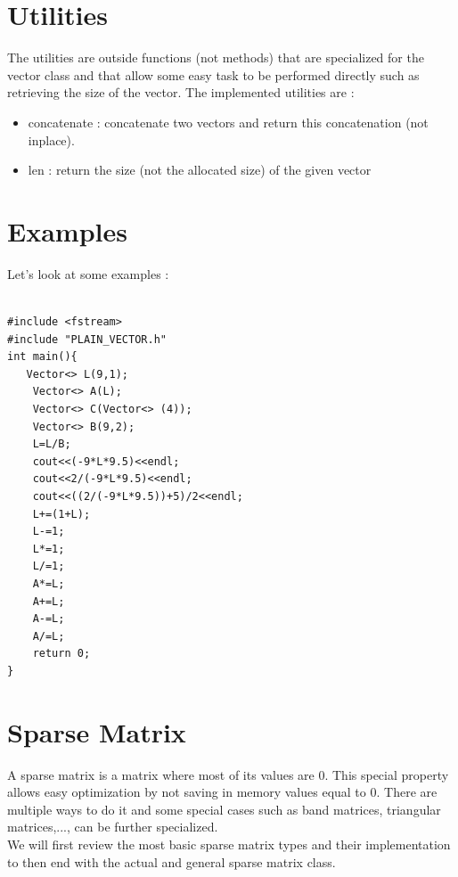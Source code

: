 \documentclass[a4paper]{report}
\begin{document}
\section{Utilities}
The utilities are outside functions (not methods) that are specialized for the vector class and that allow some easy task to be performed directly such as retrieving the size of the vector. The implemented utilities are :
\begin{itemize}
\item concatenate : concatenate two vectors and return this concatenation (not inplace).
\item len : return the size (not the allocated size) of the given vector
\end{itemize}
\section{Examples}
Let's look at some examples :
\begin{lstlisting}[basicstyle=\tiny]

#include <fstream>
#include "PLAIN_VECTOR.h"
int main(){
   Vector<> L(9,1);
    Vector<> A(L);
    Vector<> C(Vector<> (4));
    Vector<> B(9,2);
    L=L/B;
    cout<<(-9*L*9.5)<<endl;
    cout<<2/(-9*L*9.5)<<endl;
    cout<<((2/(-9*L*9.5))+5)/2<<endl;
    L+=(1+L);
    L-=1;
    L*=1;
    L/=1;
    A*=L;
    A+=L;
    A-=L;
    A/=L;
    return 0;
}

\end{lstlisting}

\section{Sparse Matrix}

A sparse matrix is a matrix where most of its values are $0$. This special property allows easy optimization by not saving in memory values equal to $0$. There are multiple ways to do it and some special cases such as band matrices, triangular matrices,..., can be further specialized.\\
We will first review the most basic sparse matrix types and their implementation to then end with the actual and general sparse matrix class.
\end{document}
